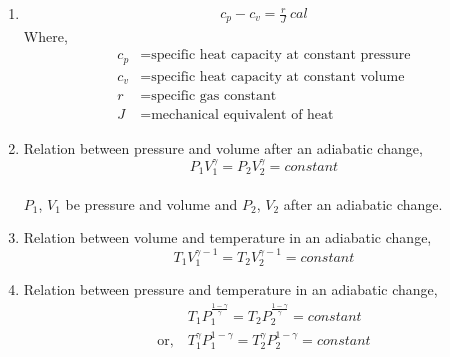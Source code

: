 \documentclass[12pt]{article}
\begin{document}
\begin{enumerate}[label=\roman*.]
	\item
		\[
		\begin{aligned}
			c_p - c_v = \frac{r}{J} \ cal
		\end{aligned}
		\]
		Where,
		\begin{align*}
			c_p &= \text{specific heat capacity at constant pressure} \\
			c_v &= \text{specific heat capacity at constant volume} \\
			r &= \text{specific gas constant} \\
			J &= \text{mechanical equivalent of heat}
		\end{align*}

	\item Relation between pressure and volume after an adiabatic change,
		$$ P_1 V_1^\gamma = P_2 V_2^\gamma = constant $$ \\
		$P_1$, $V_1$ be pressure and volume and $P_2$, $V_2$ after an
			adiabatic change.

	\item Relation between volume and temperature in an adiabatic change,
		$$ T_1 V_1^{\gamma - 1} = T_2 V_2^{\gamma - 1} = constant $$
	\item Relation between pressure and temperature in an adiabatic change,
		\begin{align*}
			& T_1 P_1^\frac{1 - \gamma}{\gamma} = T_2 P_2^\frac{1 - \gamma}{\gamma} = constant \\
			\text{or,} \ & T_1^\gamma P_1^{1 - \gamma} = T_2^\gamma P_2^{1 - \gamma} = constant
		\end{align*}
\end{enumerate}
\end{document}
